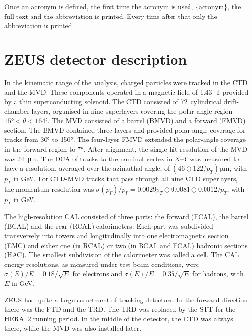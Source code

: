 Once an acronym is defined, the first time the acronym is used,
\{acronym\}, the full text and the abbreviation is
printed. Every time after that only the abbreviation is printed.

\section{ZEUS detector description}%
\label{sec:app:glossary:zeus}

\begin{tcblisting}{}
In the kinematic range of the analysis, charged particles were tracked
in the \gls{CTD} and the \gls{MVD}.
These components operated in a magnetic field of \SI{1.43}{\tesla}
provided by a thin superconducting solenoid.
The \gls{CTD} consisted of 72~cylindrical drift-chamber layers,
organised in nine superlayers covering the polar-angle region
$\ang{15} < \theta < \ang{164}$.
%
The \gls{MVD} consisted of a barrel (BMVD) and a forward (FMVD)
section. The BMVD contained three layers and provided polar-angle
coverage for tracks from \ang{30} to \ang{150}. The four-layer FMVD
extended the polar-angle coverage in the forward region to
\ang{7}. After alignment, the single-hit resolution of the MVD was
\SI{24}{\micro\metre}. The \gls{DCA} of tracks to the nominal vertex in
$X$--$Y$ was measured to have a resolution, averaged over the
azimuthal angle, of $(46 \oplus 122 / p_{T})\,\si{\micro\metre}$,
with $p_{T}$ in \si{\GeV}.
For \gls{CTD}-\gls{MVD} tracks
that pass through all nine \gls{CTD} superlayers, the momentum
resolution was $\sigma(p_{T})/p_{T} = 0.0029 p_{T} \oplus 0.0081
\oplus 0.0012/p_{T}$, with $p_{T}$ in \si{\GeV}.
\end{tcblisting}

\begin{tcblisting}{}
The high-resolution \gls{CAL} consisted of three parts: the forward
(FCAL), the barrel (BCAL) and the rear (RCAL) calorimeters. Each part
was subdivided transversely into towers and longitudinally into one
electromagnetic section (EMC) and either one (in RCAL) or two (in BCAL
and FCAL) hadronic sections (HAC). The smallest subdivision of the
calorimeter was called a cell.  The \gls{CAL} energy resolutions, as
measured under test-beam conditions, were $\sigma(E)/E=0.18/\sqrt{E}$
for electrons and $\sigma(E)/E=0.35/\sqrt{E}$ for hadrons, with $E$ in
\si{\GeV}. 

ZEUS had quite a large assortment of tracking detectors. In the
forward direction there was the \gls{FTD} and the \gls{TRD}. The
\gls{TRD} was replaced by the \gls{STT} for the HERA~2 running
period.  In the middle of the detector, the \gls{CTD} was always
there, while the \gls{MVD} was also installed later.
\end{tcblisting}
